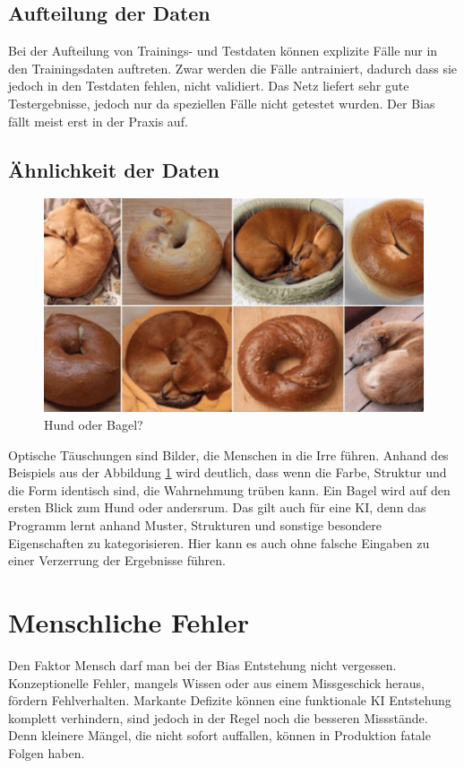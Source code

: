\documentclass[12pt,oneside,a4paper,parskip]{scrbook}
\begin{document}
\subsection{Aufteilung der Daten}
\label{section:AufteilungDerDaten}
Bei der Aufteilung von Trainings- und Testdaten können explizite Fälle nur in den Trainingsdaten auftreten. Zwar werden die Fälle antrainiert, dadurch dass sie jedoch in den Testdaten fehlen, nicht validiert. Das Netz liefert sehr gute Testergebnisse, jedoch nur da speziellen Fälle nicht getestet wurden. Der Bias fällt meist erst in der Praxis auf.
\subsection{Ähnlichkeit der Daten}
\label{section:similarData}
\begin{figure}[h]
	\begin{center}
		\includegraphics[width=15cm]{Bilder/dog_or_bagel.jpg}
		\caption{Hund oder Bagel?}
		\label{fig:dogBagel}
	\end{center}
\end{figure}

Optische Täuschungen sind Bilder, die Menschen in die Irre führen.
Anhand des Beispiels aus der Abbildung \ref{fig:dogBagel} wird deutlich,
dass wenn die Farbe, Struktur und die Form identisch sind,
die Wahrnehmung trüben kann. Ein Bagel wird auf den ersten Blick zum Hund oder andersrum.
Das gilt auch für eine KI, denn das Programm lernt anhand Muster, Strukturen und sonstige besondere Eigenschaften zu kategorisieren. Hier kann es auch ohne falsche Eingaben zu einer Verzerrung der Ergebnisse führen.

\section{Menschliche Fehler}
\label{section:humanFehler}
Den Faktor Mensch darf man bei der Bias Entstehung nicht vergessen. Konzeptionelle Fehler, mangels Wissen oder aus einem Missgeschick heraus, fördern Fehlverhalten. Markante Defizite können eine funktionale KI Entstehung komplett verhindern, sind jedoch in der Regel noch die besseren Missstände. Denn kleinere Mängel, die nicht sofort auffallen, können in Produktion fatale Folgen haben. 
\end{document}
